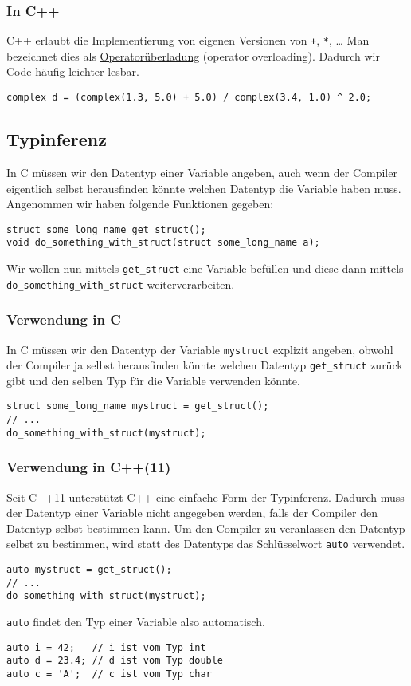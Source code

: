 \documentclass[11pt]{article}
\begin{document}
\subsubsection{In C++}
\label{sec-2-2-2}
C++ erlaubt die Implementierung von eigenen Versionen von \verb~+~, \verb~*~,
\ldots{} Man bezeichnet dies als \href{https://de.wikipedia.org/wiki/\%25C3\%259Cberladen#Operator\%C3\%BCberladung}{Operatorüberladung} (operator overloading).
Dadurch wir Code häufig leichter lesbar.
\begin{verbatim}
complex d = (complex(1.3, 5.0) + 5.0) / complex(3.4, 1.0) ^ 2.0;
\end{verbatim}

\subsection{Typinferenz}
\label{sec-2-3}
In C müssen wir den Datentyp einer Variable angeben, auch wenn der
Compiler eigentlich selbst herausfinden könnte welchen Datentyp die
Variable haben muss. Angenommen wir haben folgende Funktionen gegeben:
\begin{verbatim}
struct some_long_name get_struct();
void do_something_with_struct(struct some_long_name a);
\end{verbatim}
Wir wollen nun mittels \verb~get_struct~ eine Variable befüllen und diese
dann mittels \verb~do_something_with_struct~ weiterverarbeiten.
\subsubsection{Verwendung in C}
\label{sec-2-3-1}
In C müssen wir den Datentyp der Variable \verb~mystruct~ explizit angeben,
obwohl der Compiler ja selbst herausfinden könnte welchen Datentyp
\verb~get_struct~ zurück gibt und den selben Typ für die Variable verwenden
könnte.
\begin{verbatim}
struct some_long_name mystruct = get_struct();
// ...
do_something_with_struct(mystruct);
\end{verbatim}
\subsubsection{Verwendung in C++(11)}
\label{sec-2-3-2}
Seit C++11 unterstützt C++ eine einfache Form der \href{https://de.wikipedia.org/wiki/Typinferenz}{Typinferenz}. Dadurch
muss der Datentyp einer Variable nicht angegeben werden, falls der
Compiler den Datentyp selbst bestimmen kann. Um den Compiler zu
veranlassen den Datentyp selbst zu bestimmen, wird statt des Datentyps
das Schlüsselwort \verb~auto~ verwendet.
\begin{verbatim}
auto mystruct = get_struct();
// ...
do_something_with_struct(mystruct);
\end{verbatim}
\verb~auto~ findet den Typ einer Variable also automatisch.
\begin{verbatim}
auto i = 42;   // i ist vom Typ int
auto d = 23.4; // d ist vom Typ double
auto c = 'A';  // c ist vom Typ char
\end{verbatim}
\end{document}
